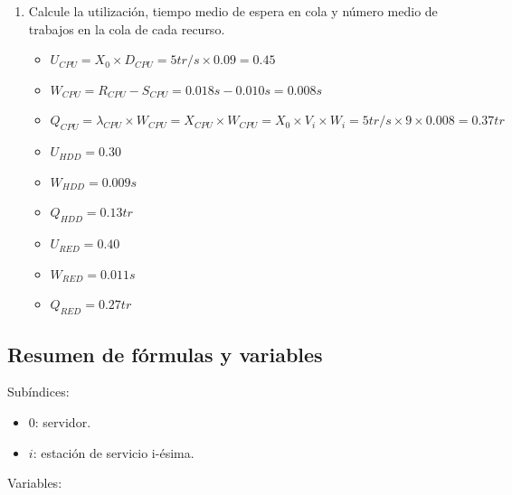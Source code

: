 \documentclass[12pt,spanish]{article}
\begin{document}
\begin{enumerate}
	\item Calcule la utilización, tiempo medio de espera en cola y número medio de trabajos en la cola de cada recurso.
		\begin{itemize}
			\item $U_{CPU} = X_0 \times D_{CPU} = 5 tr/s \times 0.09 = 0.45$
			\item $W_{CPU} = R_{CPU} - S_{CPU} = 0.018 s - 0.010 s = 0.008 s$
			\item $Q_{CPU} = \lambda_{CPU} \times W_{CPU} = X_{CPU} \times W_{CPU} = X_0 \times V_i \times W_i = 5 tr/s \times 9 \times 0.008 = 0.37 tr$
			\item $U_{HDD} = 0.30$
			\item $W_{HDD} = 0.009 s$
			\item $Q_{HDD} = 0.13 tr$
			\item $U_{RED} = 0.40$
			\item $W_{RED} = 0.011 s$
			\item $Q_{RED} = 0.27 tr$
		\end{itemize}
\end{enumerate}

\newpage

\subsection{Resumen de fórmulas y variables}

Subíndices:

\begin{itemize}
	\item $0$: servidor.
	\item $i$: estación de servicio i-ésima.
\end{itemize}

Variables:
\end{document}
